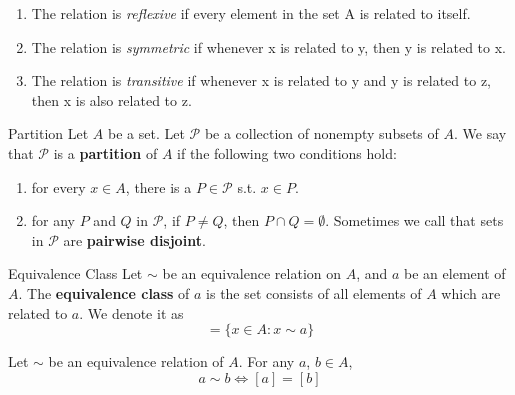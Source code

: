 \begin{remarks}
    \begin{enumerate}

        \item The relation is \textit{reflexive} if every element in the set A is related to itself.
        \item The relation is \textit{symmetric} if whenever x is related to y, then y is related to x.
        \item The relation is \textit{transitive} if whenever x is related to y and y is related to z, then x is also related to z.

    \end{enumerate}
\end{remarks}

\begin{definition}{Partition}{}
    Let $A$ be a set. Let $\mathcal{P}$ be a collection of nonempty subsets of $A$. We say that $\mathcal{P}$ is a \textbf{partition} of $A$ if the following two conditions hold:
    \begin{enumerate}

        \item for every $x \in A$, there is a $P \in \mathcal{P}$ s.t. $x \in P$.
        \item for any $P$ and $Q$ in $\mathcal{P}$, if $P \neq Q$, then $P \cap Q = \emptyset$. Sometimes we call that sets in $\mathcal{P}$ are \textbf{pairwise disjoint}.    

    \end{enumerate}
\end{definition}
    
\begin{definition}{Equivalence Class}{}
    Let $\sim$ be an equivalence relation on $A$, and $a$ be an element of $A$. The \textbf{equivalence class} of $a$ is the set consists of all elements of $A$ which are related to $a$. We denote it as
    \begin{equation*}
        [a] = \{x \in A: x \sim a\}
    \end{equation*}
\end{definition}

\begin{theorem}{}{}
    Let $\sim$ be an equivalence relation of $A$. For any $a$, $b \in A$,
    \begin{equation*}
        a \sim b \iff [a] = [b]
    \end{equation*}
\end{theorem}

